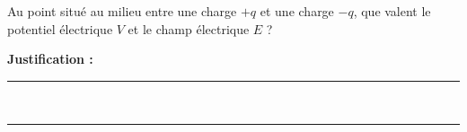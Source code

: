Au point situé au milieu entre une charge $+q$ et une charge $-q$, que valent le potentiel électrique $V$ et le champ électrique $E$ ?

\choices

\noindent\textbf{Justification :} \hrulefill \\[2.5ex]
\rule{\linewidth}{0.4pt} \\[2.5ex]
\rule{\linewidth}{0.4pt}
\vfill
